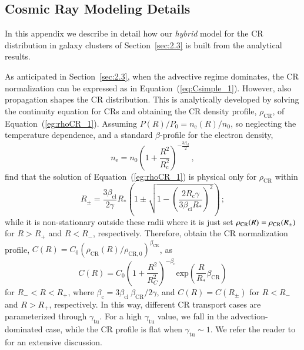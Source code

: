\documentclass[traditabstract]{aa}
\newcommand{\rmn}{\mathrm}
\begin{document}
\begin{appendix}

\section{Cosmic Ray Modeling Details}
\label{app:B}

In this appendix we describe in detail how our \emph{hybrid} model for the CR distribution 
in galaxy clusters of Section~\ref{sec:2.3} is built from the \cite{2011A&A...527A..99E} analytical 
results.

As anticipated in Section~\ref{sec:2.3}, when the advective regime dominates, the CR 
normalization can be expressed as in Equation~(\ref{eq:Csimple_1}). However, also
propagation shapes the CR distribution. This is analytically developed by solving the 
continuity equation for CRs and obtaining the CR density profile, $\rho_{\rmn{CR}}$, 
of Equation~(\ref{eg:rhoCR_1}). Assuming $P(R)/P_{0}=n_{\rmn{e}}(R)/n_{0}$, 
so neglecting the temperature dependence, and a standard $\beta$-profile for the electron density,
%
\begin{equation}
n_{\rmn{e}} = n_{0} \left( 1+\frac{R^{2}}{R_{\rmn{c}}^{2}} \right)^{-\frac{3\beta_{\rmn{cl}}}{2}} \, ,
\label{eq:beta_profile}
\end{equation}
% 
\cite{2011A&A...527A..99E} find that the solution of Equation~(\ref{eg:rhoCR_1}) is physical only 
for $\rho_{\rmn{CR}}$ within 
%
\begin{equation}
R_{\pm} = \frac{3\beta_{\rmn{cl}}}{2\gamma}R_{*}\left(1\pm\sqrt{1-\left(\frac{2R_{\rmn{c}}\gamma}{3\beta_{\rmn{cl}}R_{*}}\right)^{2}}\right) \, ;
\label{eq:Rpm}
\end{equation} 
%
while it is non-stationary outside these radii where it is just set $\rho_{\rmn{CR}}(R) = \rho_{\rm{CR}}(R_{\pm})$
for $R > R_{+}$ and $R < R_{-}$, respectively. Therefore, \cite{2011A&A...527A..99E} obtain the CR normalization 
profile, $C(R)=C_{0}(\rho_{\rmn{CR}}(R)/\rho_{\rmn{CR},0})^{\beta_{\rmn{CR}}}$, as
%
\begin{equation}
C(R) = C_{0}\left( 1+ \frac{R^{2}}{R_{C}^{2}} \right)^{-\beta_{\rmn{c}}} \rmn{exp}\left( {\frac{R}{R_{*}}\beta_{\rmn{CR}}} \right)
\label{eq:Ctransport}
\end{equation} 
%
for $R_{-}<R<R_{+}$, where $\beta_{\rmn{c}}=3\beta_{\rmn{cl}}~\beta_{\rmn{CR}}/2\gamma$, 
and $C(R) = C(R_{\pm})$ for $R<R_{-}$ and $R>R_{+}$, respectively. In this way, 
different CR transport cases are parameterized through $\gamma_{\rmn{tu}}$. 
For a high $\gamma_{\rmn{tu}}$ value, we fall in the advection-dominated case, while the CR 
profile is flat when $\gamma_{\rmn{tu}} \sim1$. We refer the reader to \cite{2011A&A...527A..99E}
for an extensive discussion.


\end{appendix}
\end{document}
